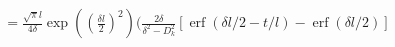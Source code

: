 \documentclass{article}
\newcommand{\erf}{\operatorname{erf}}
\begin{document}
\begin{multline}
  = 
  \frac{\sqrt{\pi}l}{4\delta}\exp\left(\left(\frac{\delta l}{2}\right)^2\right)
  \bigg(
  \frac{2 \delta}{\delta^2 - D_k^2}
  [\erf(\delta l / 2 - t/l) - \erf(\delta l / 2)]\\

\end{multline}
\end{document}
